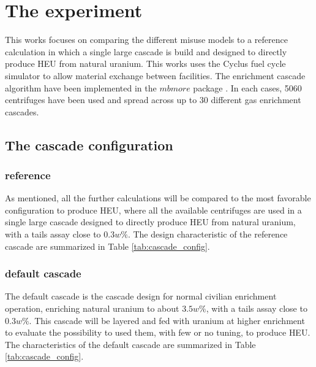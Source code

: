 \section{The experiment}
This works focuses on comparing the different misuse models to a reference
calculation in which a single large cascade is build and designed to directly
produce \gls{HEU} from natural uranium.
This works uses the Cyclus fuel cycle simulator to allow material exchange
between facilities. The enrichment cascade algorithm have been implemented in
the $mbmore$ package \cite{mbmore.2018}.
In each cases, 5060 centrifuges have been used and spread across up to 30
different gas enrichment cascades. 


\subsection{The cascade configuration}

\subsubsection{reference}

As mentioned, all the further calculations will be compared to the most
favorable configuration to produce \gls{HEU}, where all the available
centrifuges are used in a single large cascade designed to directly produce
\gls{HEU} from natural uranium, with a tails assay close to $0.3w\%$. The design
characteristic of the reference cascade are summarized in Table
\ref{tab:cascade_config}.

\subsubsection{default cascade}

The default cascade is the cascade design for normal civilian enrichment
operation, enriching natural uranium to about $3.5w\%$, with a tails assay close
to $0.3w\%$. This cascade will be layered and fed with uranium at higher
enrichment to evaluate the possibility to used them, with few or no tuning, to
produce \gls{HEU}. The characteristics of the default cascade are summarized in
Table \ref{tab:cascade_config}.

